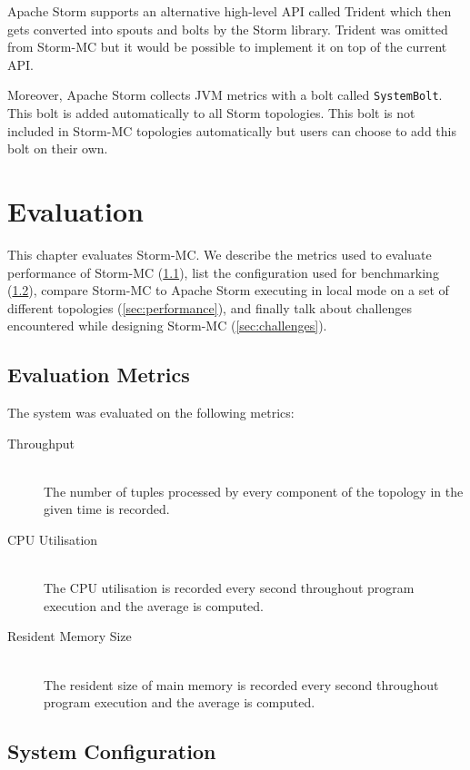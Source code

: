 \documentclass[bsc,logo,frontabs,twoside,singlespacing,normalheadings,parskip]{infthesis}\usepackage[]{graphicx}\usepackage[]{color}
\begin{document}
Apache Storm supports an alternative high-level API called Trident which then gets converted into spouts and bolts by the Storm library. Trident was omitted from Storm-MC but it would be possible to implement it on top of the current API.

Moreover, Apache Storm collects JVM metrics with a bolt called \texttt{SystemBolt}. This bolt is added automatically to all Storm topologies. This bolt is not included in Storm-MC topologies automatically but users can choose to add this bolt on their own.


\clearpage{}

\clearpage{}\clearpage{}

\clearpage{}\chapter{Evaluation}

This chapter evaluates Storm-MC. We describe the metrics used to evaluate performance of Storm-MC (\ref{sec:metrics}), list the configuration used for benchmarking (\ref{sec:system_conf}), compare Storm-MC to Apache Storm executing in local mode on a set of different topologies (\ref{sec:performance}), and finally talk about challenges encountered while designing Storm-MC (\ref{sec:challenges}).

\section{Evaluation Metrics}
\label{sec:metrics}

The system was evaluated on the following metrics:

\begin{description}
	\item[Throughput] \hfill \\
	The number of tuples processed by every component of the topology in the given time is recorded.
	\item[CPU Utilisation] \hfill \\
	The CPU utilisation is recorded every second throughout program execution and the average is computed.
	\item[Resident Memory Size] \hfill \\
	The resident size of main memory is recorded every second throughout program execution and the average is computed.
\end{description}

\section{System Configuration}
\label{sec:system_conf}
\end{document}
